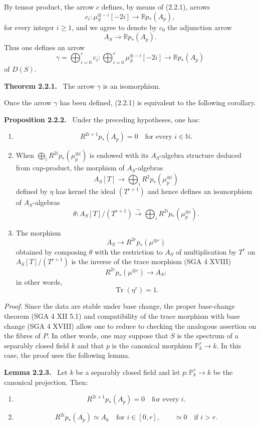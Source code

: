 \documentclass[11pt]{article}
\newenvironment{statement}[1]{\par\medskip\noindent\textbf{#1.}\ }{\par\medskip}
\begin{document}
By tensor product, the arrow $c$ defines, by means of (2.2.1), arrows
\[
c_i:\mu_S^{\otimes -i}[-2i]\longrightarrow \mathbb{R}p_*(A_p),
\]
for every integer $i\ge1$, and we agree to denote by $c_0$ the adjunction arrow
\[
A_S\longrightarrow \mathbb{R}p_*(A_p).
\]
Thus one defines an arrow
\[
\gamma=\bigoplus_{i=0}^{r}c_i:
\bigoplus_{i=0}^{r}\mu_S^{\otimes -i}[-2i]\longrightarrow \mathbb{R}p_*(A_p)
\]
of $D(S)$.

\begin{statement}{Theorem 2.2.1}
The arrow $\gamma$ is an isomorphism.
\end{statement}

Once the arrow $\gamma$ has been defined, (2.2.1) is equivalent to the following corollary.

\begin{statement}{Proposition 2.2.2}
Under the preceding hypotheses, one has:
\begin{enumerate}[label=\alph*)]
\item
\[
R^{2i+1}p_*(A_p)=0\quad\text{for every }i\in\mathbb N.
\]
\item When $\bigoplus_i R^{2i}p_*(\mu_p^{\otimes i})$ is endowed with its $A_S$-algebra structure deduced from cup-product, the morphism of $A_S$-algebras
\[
A_S[T]\longrightarrow \bigoplus_i R^{2}p_*(\mu_p^{\otimes i})
\]
defined by $\eta$ has kernel the ideal $(T^{r+1})$ and hence defines an isomorphism of $A_S$-algebras
\[
\theta:A_S[T]/(T^{r+1})\xrightarrow{\sim}\bigoplus_i R^{2i}p_*(\mu_p^{\otimes i}).
\]
\item The morphism
\[
A_S\longrightarrow R^{2r}p_*(\mu^{\otimes r})
\]
obtained by composing $\theta$ with the restriction to $A_S$ of multiplication by $T^r$ on $A_S[T]/(T^{r+1})$ is the inverse of the trace morphism (SGA 4 XVIII)
\[
R^{2r}p_*(\mu^{\otimes r})\longrightarrow A_S;
\]
in other words,
\[
\operatorname{Tr}(\eta^r)=1.
\]
\end{enumerate}
\end{statement}

\emph{Proof.} Since the data are stable under base change, the proper base-change theorem (SGA 4 XII 5.1) and compatibility of the trace morphism with base change (SGA 4 XVIII) allow one to reduce to checking the analogous assertion on the fibres of $P$. In other words, one may suppose that $S$ is the spectrum of a separably closed field $k$ and that $p$ is the canonical morphism $\mathbb P^r_k\to k$. In this case, the proof uses the following lemma.

\begin{statement}{Lemma 2.2.3}
Let $k$ be a separably closed field and let $p:\mathbb P_k^r\to k$ be the canonical projection. Then:
\begin{enumerate}[label=\alph*)]
\item
\[
R^{2i+1}p_*(A_p)=0\quad\text{for every }i.
\]
\item
\[
R^{2i}p_*(A_p)\simeq A_k\quad\text{for }i\in[0,r],
\qquad
\simeq 0\quad\text{if }i>r.
\]
\end{enumerate}
\end{statement}
\end{document}
